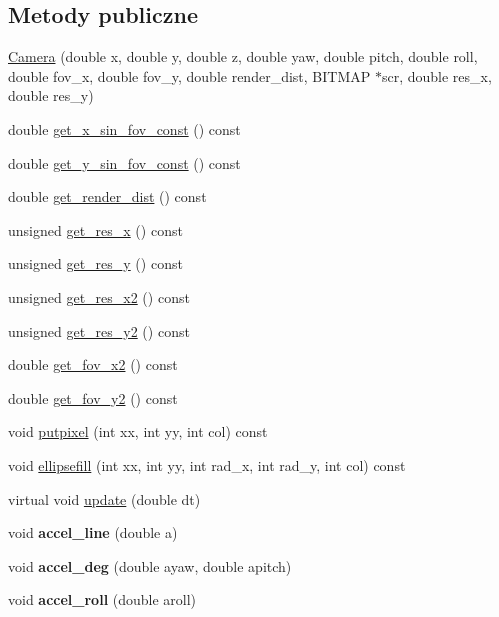 \subsection*{Metody publiczne}
\begin{DoxyCompactItemize}
\item 
\hyperlink{class_camera_aa4fab6c2c09702f8e70d0688ea90c0ae}{Camera} (double x, double y, double z, double yaw, double pitch, double roll, double fov\+\_\+x, double fov\+\_\+y, double render\+\_\+dist, B\+I\+T\+M\+AP $\ast$scr, double res\+\_\+x, double res\+\_\+y)
\item 
double \hyperlink{class_camera_ad85cea48af89cad24edc3eb2bdcdf7ee}{get\+\_\+x\+\_\+sin\+\_\+fov\+\_\+const} () const 
\item 
double \hyperlink{class_camera_a87266e92e70522c3d0e1c397b4ada1af}{get\+\_\+y\+\_\+sin\+\_\+fov\+\_\+const} () const 
\item 
double \hyperlink{class_camera_a1bda457bae36f6a8d0ecf29bd0ec19a9}{get\+\_\+render\+\_\+dist} () const 
\item 
unsigned \hyperlink{class_camera_a744c0732cff592644a4f0e62654d1d10}{get\+\_\+res\+\_\+x} () const 
\item 
unsigned \hyperlink{class_camera_a7d62c7d80c97dc2e703544e7280a5208}{get\+\_\+res\+\_\+y} () const 
\item 
unsigned \hyperlink{class_camera_aa106361d6bab194723cb746c22df8cbe}{get\+\_\+res\+\_\+x2} () const 
\item 
unsigned \hyperlink{class_camera_af0d5d16f478c68fdc8f3bfda7db0ad72}{get\+\_\+res\+\_\+y2} () const 
\item 
double \hyperlink{class_camera_a3537564f96a44b3480d5581c7fec5576}{get\+\_\+fov\+\_\+x2} () const 
\item 
double \hyperlink{class_camera_a160845f2c2da8ef18459b4fc1d5c3929}{get\+\_\+fov\+\_\+y2} () const 
\item 
void \hyperlink{class_camera_a02a92079d7a27b0801611c280b17002b}{putpixel} (int xx, int yy, int col) const 
\item 
void \hyperlink{class_camera_adfd2ffd6a173e3125a220164687d88b1}{ellipsefill} (int xx, int yy, int rad\+\_\+x, int rad\+\_\+y, int col) const 
\item 
virtual void \hyperlink{class_camera_ab521598bed84988be95a89dfcdd9f1aa}{update} (double dt)
\item 
void {\bfseries accel\+\_\+line} (double a)\hypertarget{class_camera_aa8322375b803f39cb2071be302de4d6e}{}\label{class_camera_aa8322375b803f39cb2071be302de4d6e}

\item 
void {\bfseries accel\+\_\+deg} (double ayaw, double apitch)\hypertarget{class_camera_a301f57ac80bd72485ba854cc08133a82}{}\label{class_camera_a301f57ac80bd72485ba854cc08133a82}

\item 
void {\bfseries accel\+\_\+roll} (double aroll)\hypertarget{class_camera_a7cdb0dd64bb945b4505bc9e8f3ceb980}{}\label{class_camera_a7cdb0dd64bb945b4505bc9e8f3ceb980}

\end{DoxyCompactItemize}
